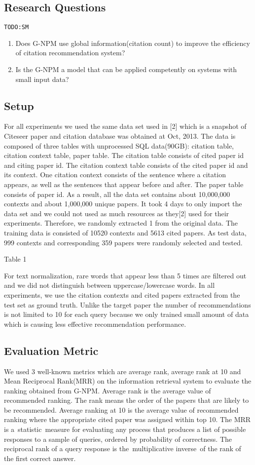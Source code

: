 \documentclass{llncs}
\newcommand{\todo}[1]{\texttt{\color{red}TODO:#1}}
\begin{document}
\subsection{Research Questions}
\todo{SM}

\begin{enumerate}
\item Does G-NPM use global information(citation count) to improve the efficiency of citation recommendation system?
\item Is the G-NPM a model that can be applied competently on systems with small input data?
\end{enumerate}
\subsection{Setup}
For all experiments we used the same data set used in [2] which is a snapshot of Citeseer paper and citation database was obtained at Oct, 2013. The data is composed of three tables with unprocessed SQL data(90GB): citation table, citation context table, paper table. The citation table consists of cited paper id and citing paper id. The citation context table consists of the cited paper id and its context. One citation context consists of the sentence where a citation appears, as well as the sentences that appear before and after. The paper table consists of paper id. As a result, all the data set contains about 10,000,000 contexts and about 1,000,000 unique papers.
It took 4 days to only import the data set and we could not used as much resources as they[2] used for their experiments. Therefore, we randomly extracted 1 from the original data. The training data is consisted of 10520 contexts and 5613 cited papers. As test data, 999 contexts and corresponding 359 papers were randomly selected and tested.


Table 1

For text normalization, rare words that appear less than 5 times are filtered out and we did not distinguish between uppercase/lowercase words. In all experiments, we use the citation contexts and cited papers extracted from the test set as ground truth. Unlike the target paper the number of recommendations is not limited to 10 for each query because we only trained small amount of data which is causing less effective recommendation performance.

\subsection{Evaluation Metric}
We used 3 well-known metrics which are average rank, average rank at 10 and Mean Reciprocal Rank(MRR) on the information retrieval system to evaluate the ranking obtained from G-NPM. Average rank is the average value of recommended ranking. The rank means the order of the papers that are likely to be recommended. Average ranking at 10 is the average value of recommended ranking where the appropriate cited paper was assigned within top 10. The MRR is a statistic measure for evaluating any process that produces a list of possible responses to a sample of queries, ordered by probability of correctness. The reciprocal rank of a query response is the multiplicative inverse of the rank of the first correct answer.
\end{document}
